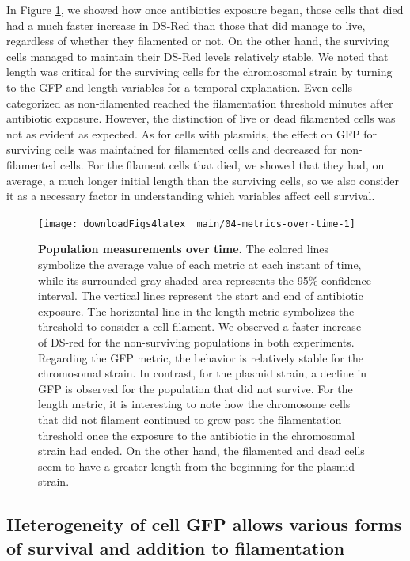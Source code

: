\documentclass[a4paper, nobind]{templates/ociamthesis}
\begin{document}
In Figure \ref{fig:04-metrics-over-time-1}, we showed how once antibiotics exposure began, those cells that died had a much faster increase in DS-Red than those that did manage to live, regardless of whether they filamented or not.
On the other hand, the surviving cells managed to maintain their DS-Red levels relatively stable.
We noted that length was critical for the surviving cells for the chromosomal strain by turning to the GFP and length variables for a temporal explanation.
Even cells categorized as non-filamented reached the filamentation threshold minutes after antibiotic exposure.
However, the distinction of live or dead filamented cells was not as evident as expected.
As for cells with plasmids, the effect on GFP for surviving cells was maintained for filamented cells and decreased for non-filamented cells.
For the filament cells that died, we showed that they had, on average, a much longer initial length than the surviving cells, so we also consider it as a necessary factor in understanding which variables affect cell survival.





\begin{figure}[H]
\texttt{[image: downloadFigs4latex\_\_main/04-metrics-over-time-1]} \caption[Population measurements over time.]{\textbf{Population measurements over time.} The colored lines symbolize the average value of each metric at each instant of time, while its surrounded gray shaded area represents the 95\% confidence interval. The vertical lines represent the start and end of antibiotic exposure. The horizontal line in the length metric symbolizes the threshold to consider a cell filament. We observed a faster increase of DS-red for the non-surviving populations in both experiments. Regarding the GFP metric, the behavior is relatively stable for the chromosomal strain. In contrast, for the plasmid strain, a decline in GFP is observed for the population that did not survive. For the length metric, it is interesting to note how the chromosome cells that did not filament continued to grow past the filamentation threshold once the exposure to the antibiotic in the chromosomal strain had ended. On the other hand, the filamented and dead cells seem to have a greater length from the beginning for the plasmid strain.}\label{fig:04-metrics-over-time-1}
\end{figure}

\hypertarget{heterogeneity-of-cell-gfp-allows-various-forms-of-survival-and-addition-to-filamentation}{%
\subsection{Heterogeneity of cell GFP allows various forms of survival and addition to filamentation}\label{heterogeneity-of-cell-gfp-allows-various-forms-of-survival-and-addition-to-filamentation}}
\end{document}
